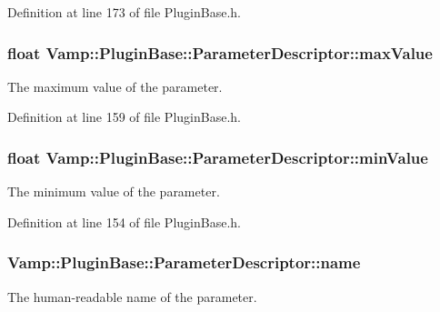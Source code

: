 Definition at line 173 of file Plugin\+Base.\+h.

\subsubsection[{\texorpdfstring{max\+Value}{maxValue}}]{\setlength{\rightskip}{0pt plus 5cm}float Vamp\+::\+Plugin\+Base\+::\+Parameter\+Descriptor\+::max\+Value}\hypertarget{struct_vamp_1_1_plugin_base_1_1_parameter_descriptor_ab934b20dd708228a0e3c2811a3e2cec4}{}\label{struct_vamp_1_1_plugin_base_1_1_parameter_descriptor_ab934b20dd708228a0e3c2811a3e2cec4}
The maximum value of the parameter. 

Definition at line 159 of file Plugin\+Base.\+h.

\subsubsection[{\texorpdfstring{min\+Value}{minValue}}]{\setlength{\rightskip}{0pt plus 5cm}float Vamp\+::\+Plugin\+Base\+::\+Parameter\+Descriptor\+::min\+Value}\hypertarget{struct_vamp_1_1_plugin_base_1_1_parameter_descriptor_ab3e4d84f5bc199eea8b642b27e425ec8}{}\label{struct_vamp_1_1_plugin_base_1_1_parameter_descriptor_ab3e4d84f5bc199eea8b642b27e425ec8}
The minimum value of the parameter. 

Definition at line 154 of file Plugin\+Base.\+h.

\subsubsection[{\texorpdfstring{name}{name}}]{ Vamp\+::\+Plugin\+Base\+::\+Parameter\+Descriptor\+::name}\hypertarget{struct_vamp_1_1_plugin_base_1_1_parameter_descriptor_a0ecebb94fb4ada4aad2640e20aa57084}{}\label{struct_vamp_1_1_plugin_base_1_1_parameter_descriptor_a0ecebb94fb4ada4aad2640e20aa57084}
The human-\/readable name of the parameter. 

